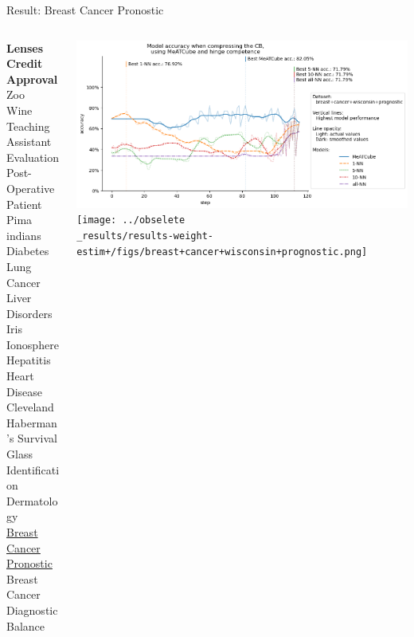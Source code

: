 \documentclass[]{beamer}
\begin{document}
\begin{frame}{Result: Breast Cancer Pronostic}
    \begin{columns}
        \begin{column}{.3\textwidth}
            {\smaller\smaller\smaller
            \textbf{Lenses} \\
            \textbf{Credit Approval} \\
            Zoo \\
            Wine \\
            Teaching Assistant Evaluation \\
            Post-Operative Patient \\
            Pima indians Diabetes \\
            Lung Cancer \\
            Liver Disorders \\
            Iris \\
            Ionosphere \\
            Hepatitis \\
            Heart Disease Cleveland \\
            Haberman's Survival \\
            Glass Identification \\
            Dermatology \\
            \underline{Breast Cancer Pronostic} \\
            Breast Cancer Diagnostic \\
            Balance\\
            ~}
        \end{column}
        \begin{column}{.7\textwidth}
            \includegraphics[width=\textwidth]{../results-no-sim-tuning+/figs/breast+cancer+wisconsin+prognostic.png}
            \texttt{[image: ../obselete\\\_results/results-weight-estim+/figs/breast+cancer+wisconsin+prognostic.png]}
        \end{column}
    \end{columns}
\end{frame}
\end{document}
